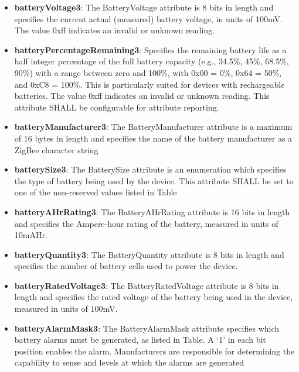 \begin{itemize}
\item \textbf{batteryVoltage3}: The BatteryVoltage attribute is 8 bits in length and specifies the current actual (measured) battery voltage, in units of 100mV. The value 0xff indicates an invalid or unknown reading.
\item \textbf{batteryPercentageRemaining3}: Specifies the remaining battery life as a half integer percentage of the full battery capacity (e.g., 34.5\%, 45\%, 68.5\%, 90\%) with a range between zero and 100\%, with 0x00 = 0\%, 0x64 = 50\%, and 0xC8 = 100\%. This is particularly suited for devices with rechargeable batteries. The value 0xff indicates an invalid or unknown reading. This attribute SHALL be configurable for attribute reporting.
\item \textbf{batteryManufacturer3}: The BatteryManufacturer attribute is a maximum of 16 bytes in length and specifies the name of the battery manufacturer as a ZigBee character string
\item \textbf{batterySize3}: The BatterySize attribute is an enumeration which specifies the type of battery being used by the device. This attribute SHALL be set to one of the non-reserved values listed in Table
\item \textbf{batteryAHrRating3}: The BatteryAHrRating attribute is 16 bits in length and specifies the Ampere-hour rating of the battery, measured in units of 10mAHr.
\item \textbf{batteryQuantity3}: The BatteryQuantity attribute is 8 bits in length and specifies the number of battery cells used to power the device.
\item \textbf{batteryRatedVoltage3}: The BatteryRatedVoltage attribute is 8 bits in length and specifies the rated voltage of the battery being used in the device, measured in units of 100mV.
\item \textbf{batteryAlarmMask3}: The BatteryAlarmMask attribute specifies which battery alarms must be generated, as listed in Table. A ‘1’ in each bit position enables the alarm. Manufacturers are responsible for determining the capability to sense and levels at which the alarms are generated

\end{itemize}
